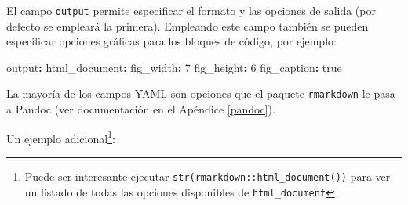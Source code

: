 \documentclass[
]{book}
\newenvironment{Shaded}{\begin{snugshade}}{\end{snugshade}}
\newcommand{\AttributeTok}[1]{\textcolor[rgb]{0.77,0.63,0.00}{#1}}
\newcommand{\CharTok}[1]{\textcolor[rgb]{0.31,0.60,0.02}{#1}}
\newcommand{\DecValTok}[1]{\textcolor[rgb]{0.00,0.00,0.81}{#1}}
\newcommand{\FunctionTok}[1]{\textcolor[rgb]{0.00,0.00,0.00}{#1}}
\newcommand{\KeywordTok}[1]{\textcolor[rgb]{0.13,0.29,0.53}{\textbf{#1}}}
\theoremstyle{definition}
\theoremstyle{definition}
\theoremstyle{definition}
\theoremstyle{definition}
\theoremstyle{remark}
\begin{document}
El campo \texttt{output} permite especificar el formato y las opciones de salida (por defecto se empleará la primera). Empleando este campo también se pueden especificar opciones gráficas para los bloques de código, por ejemplo:

\begin{Shaded}
\begin{Highlighting}[]
\FunctionTok{output}\KeywordTok{:}
\AttributeTok{  }\FunctionTok{html\_document}\KeywordTok{:}
\AttributeTok{    }\FunctionTok{fig\_width}\KeywordTok{:}\AttributeTok{ }\DecValTok{7}
\AttributeTok{    }\FunctionTok{fig\_height}\KeywordTok{:}\AttributeTok{ }\DecValTok{6}
\AttributeTok{    }\FunctionTok{fig\_caption}\KeywordTok{:}\AttributeTok{ }\CharTok{true}
\end{Highlighting}
\end{Shaded}

La mayoría de los campos YAML son opciones que el paquete \texttt{rmarkdown} le pasa a Pandoc
(ver documentación en el Apéndice \ref{pandoc}).

Un ejemplo adicional\footnote{Puede ser interesante ejecutar \texttt{str(rmarkdown::html\_document())}
  para ver un listado de todas las opciones disponibles de \texttt{html\_document}}:
\end{document}
